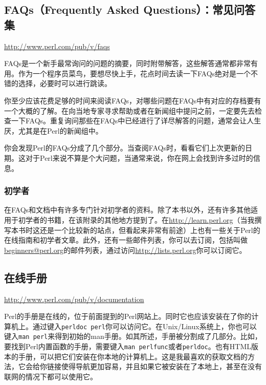 \subsection{FAQs（Frequently Asked Questions）：常见问答集}
\href{http://www.perl.com/pub/v/faqs}{http://www.perl.com/pub/v/faqs}

\begin{adjustwidth}{1cm}{}
FAQs是一个新手最常询问的问题的摘要，同时附带解答，这些解答通常都非常有用。作为一个程序员菜鸟，要想尽快上手，花点时间去读一下FAQs绝对是一个不错的选择，必要时可以进行跳读。
\end{adjustwidth}

你至少应该花费足够的时间来阅读FAQs，对哪些问题在FAQs中有对应的存档要有一个大概的了解。在向当地专家寻求帮助或者在新闻组中提问之前，一定要先去检查一下FAQs。重复询问那些在FAQs中已经进行了详尽解答的问题，通常会让人生厌，尤其是在Perl的新闻组中。

你会发现Perl的FAQs分成了几个部分。当查阅FAQs时，看看它们上次更新的日期。这对于Perl来说不算是个大问题，当通常来说，你在网上会找到许多过时的信息。

\subsubsection{初学者}
在FAQs和文档中有许多专门针对初学者的资料。除了本书以外，还有许多其他适用于初学者的书籍，在该附录的其他地方提到了。在\href{http://learn.perl.org}{http://learn.perl.org}（当我撰写本书时这还是一个比较新的站点，但看起来非常有前途）上也有一些关于Perl的在线指南和初学者文章。此外，还有一些邮件列表，你可以去订阅，包括叫做\href{mailto:beginners@perl.org}{beginners@perl.org}的邮件列表，通过访问\href{http://lists.perl.org}{http://lists.perl.org}你可以订阅它。

\subsection{在线手册}
\href{http://www.perl.com/pub/v/documentation}{http://www.perl.com/pub/v/documentation}

\begin{adjustwidth}{1cm}{}
Perl的手册是在线的，位于前面提到的Perl网站上。同时它也应该安装在了你的计算机上。通过键入\verb|perldoc perl|你可以访问它。在Unix/Linux系统上，你也可以键入\verb|man perl|来得到初始的man手册。如其所述，手册被分割成了几部分。比如，要找到Perl内置函数的手册，需要键入\verb|man perlfunc|或者\verb|perldoc|。也有HTML版本的手册，可以把它们安装在你本地的计算机上。这是我最喜欢的获取文档的方法，它会给你链接使得导航更加容易，并且如果它被安装在了本地上，甚至在没有联网的情况下都可以使用它。
\end{adjustwidth}

